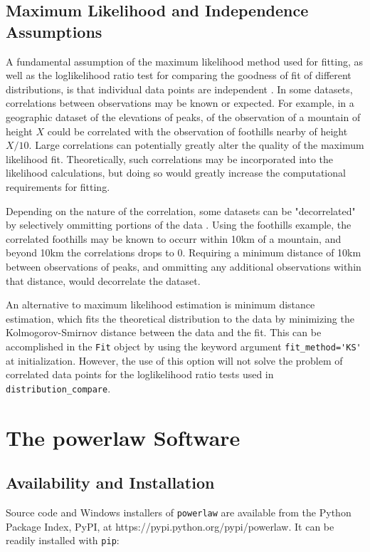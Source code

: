 \documentclass[10pt]{article}
\begin{document}
\subsection*{Maximum Likelihood and Independence Assumptions}
A fundamental assumption of the maximum likelihood method used for fitting, as well as the loglikelihood ratio test for comparing the goodness of fit of different distributions, is that individual data points are independent \cite{Clauset2009}. In some datasets, correlations between observations may be known or expected. For example, in a geographic dataset of the elevations of peaks, of the observation of a mountain of height $X$ could be correlated with the observation of foothills nearby of height $X/10$. Large correlations can potentially greatly alter the quality of the maximum likelihood fit. Theoretically, such correlations may  be incorporated into the likelihood calculations, but doing so would greatly increase the computational requirements for fitting.

Depending on the nature of the correlation, some datasets can be "decorrelated" by selectively ommitting portions of the data \cite{Klaus2011}. Using the foothills example, the correlated foothills may be known to occurr within 10km of a mountain, and beyond 10km the correlations drops to 0. Requiring a minimum distance of 10km between observations of peaks, and ommitting any additional observations within that distance, would decorrelate the dataset. 

An alternative to maximum likelihood estimation is minimum distance estimation, which fits the theoretical distribution to the data by minimizing the Kolmogorov-Smirnov distance between the data and the fit. This can be accomplished in the \verb$Fit$ object by using the keyword argument \verb$fit_method='KS'$ at initialization. However, the use of this option will not solve the problem of correlated data points for the loglikelihood ratio tests used in \verb$distribution_compare$.

\section*{The powerlaw Software}
\subsection*{Availability and Installation}
Source code and Windows installers of \verb$powerlaw$ are available from the Python Package Index, PyPI, at https://pypi.python.org/pypi/powerlaw. It can be readily installed with \verb$pip$:
\end{document}

